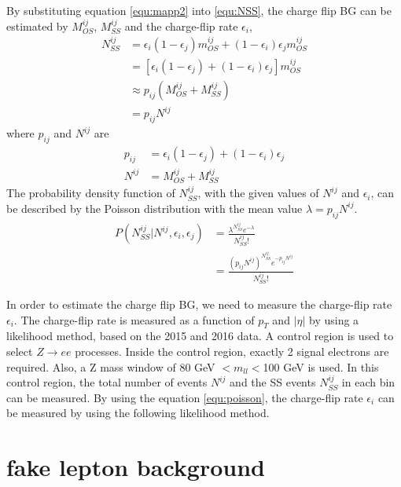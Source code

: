 By substituting equation \ref{equ:mapp2} into \ref{equ:NSS}, the charge flip BG can be estimated by $M^{ij}_{OS}$, $M^{ij}_{SS}$ and the charge-flip rate $\epsilon_i$,
\begin{align}
N^{ij}_{SS} &= \epsilon_i (1-\epsilon_j) m^{ij}_{OS} + (1-\epsilon_i) \epsilon_j m^{ij}_{OS} \\
&= [ \epsilon_i (1-\epsilon_j) + (1-\epsilon_i) \epsilon_j ] m^{ij}_{OS} \\
&\approx p_{ij} (M^{ij}_{OS} + M^{ij}_{SS}) \\
&=p_{ij} N^{ij}
\label{equ:NSS2}
\end{align}
where $p_{ij}$ and $N^{ij}$ are
\begin{align}
p_{ij} &= \epsilon_i (1-\epsilon_j) + (1-\epsilon_i) \epsilon_j \\
N^{ij} &= M^{ij}_{OS} + M^{ij}_{SS}
\end{align}
The probability density function of $N^{ij}_{SS}$, with the given values of $N^{ij}$ and $\epsilon_i$, can be described by the Poisson distribution with the mean value $\lambda = p_{ij} N^{ij}$.
\begin{align}
P(N^{ij}_{SS}|N^{ij},\epsilon_i,\epsilon_j) &= \frac{ \lambda^{N^{ij}_{SS}} e^{-\lambda} }{N^{ij}_{SS}!} \\
 &= \frac{ (p_{ij} N^{ij})^{N^{ij}_{SS}} e^{- p_{ij} N^{ij}} }{N^{ij}_{SS}!}
\label{equ:poisson}
\end{align}

In order to estimate the charge flip BG, we need to measure the charge-flip rate $\epsilon_i$.
The charge-flip rate is measured as a function of $p_T$ and $|\eta|$ by using a likelihood method, based on the 2015 and 2016 data.
A control region is used to select $Z \rightarrow ee$ processes.
Inside the control region, exactly 2 signal electrons are required.
Also, a Z mass window of 80 GeV $<m_{ll}<$100 GeV is used.
In this control region, the total number of events $N^{ij}$ and the SS events $N^{ij}_{SS}$ in each bin can be measured.
By using the equation \ref{equ:poisson}, the charge-flip rate $\epsilon_i$ can be measured by using the following likelihood method.

\section{fake lepton background}
